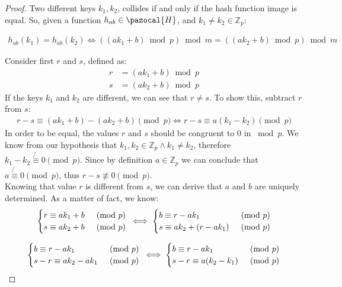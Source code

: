 \documentclass{article}
\newcommand{\Hb}{\pazocal{H}}
\begin{document}
\begin{proof}

Two different keys $k_1, k_2$, collides if and only if the hash function image is equal. So, given a function $h_{ab} \in \Hb$, and $k_1 \ne k_2 \in \mathbb{Z}_p$:

\begin{align*}
h_{ab}(k_1) = h_{ab}(k_2)
\iff ((ak_1 + b) \bmod p) \bmod m = ((ak_2 + b) \bmod p) \bmod m
\end{align*}

\noindent Consider first $r$ and $s$, defined as:
\begin{align*}
    r &= (ak_1 + b) \bmod p \\
    s &= (ak_2 + b) \bmod p
\end{align*}
\noindent If the keys $k_1$ and $k_2$ are different, we can see that $r \ne s$. To show this, subtract $r$ from $s$:
\begin{align*}
    r - s \equiv (ak_1 + b) - (ak_2 + b) \pmod p \iff r - s \equiv a(k_1 - k_2) \pmod p
\end{align*}
In order to be equal, the values $r$ and $s$ should be congruent to $0$ in $\bmod p$. We know from our hypothesis that $k_1, k_2 \in \mathbb{Z}_p \land k_1 \ne k_2$, therefore $k_1 - k_2 \not{\equiv} 0 \pmod p$. Since by definition $a \in \mathbb{Z}_p$ we can conclude that $a \not{\equiv} 0 \pmod p$, thus $r - s \not\equiv 0 \pmod p$.\\

\noindent Knowing that value $r$ is different from $s$, we can derive that $a$ and $b$ are uniquely determined. As a matter of fact, we know:
\begin{equation*}
    \begin{cases}
        r \equiv ak_1 + b & \pmod p \\
        s \equiv ak_2 + b & \pmod p
    \end{cases} \\
    \iff
    \begin{cases}
        b \equiv r - ak_1 & \pmod p \\
        s \equiv ak_2 + (r - ak_1) & \pmod p
    \end{cases}
\end{equation*}

\begin{equation*}
    \begin{cases}
        b \equiv r - ak_1 & \pmod p \\
        s - r \equiv ak_2 - ak_1 & \pmod p
    \end{cases} \\
    \iff
    \begin{cases}
        b \equiv r - ak_1 & \pmod p \\
        s - r \equiv a(k_2 - k_1) & \pmod p
    \end{cases} 
\end{equation*}


\end{proof}
\end{document}
